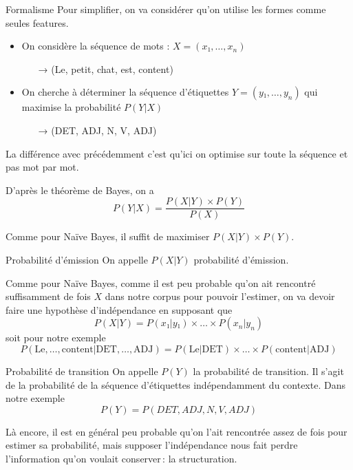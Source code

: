 \documentclass[../allslides.tex]{subfiles}
\begin{document}
\begin{frame}{Formalisme}
	Pour simplifier, on va considérer qu'on utilise les formes comme seules features.

	\begin{itemize}
		\item On considère la séquence de mots : $X=(x₁, …, x_n)$
			\begin{itemize}
				\item[→] (Le, petit, chat, est, content)
			\end{itemize}
		\item On cherche à déterminer la séquence d'étiquettes $Y=(y₁, …, y_n)$ qui maximise la probabilité $P(Y|X)$
			\begin{itemize}
				\item[→] (DET, ADJ, N, V, ADJ)
			\end{itemize}
	\end{itemize}

	La différence avec précédemment c'est qu'ici on optimise sur toute la séquence et pas mot par mot.

	\pause

	D'après le théorème de Bayes, on a
	\begin{equation}
		P(Y|X) = \frac{P(X|Y)×P(Y)}{P(X)}
	\end{equation}

	Comme pour Naïve Bayes, il suffit de maximiser $P(X|Y)×P(Y)$.
\end{frame}

\begin{frame}{Probabilité d'émission}
	On appelle $P(X|Y)$ \alert{probabilité d'émission}.

	Comme pour Naïve Bayes, comme il est peu probable qu'on ait rencontré suffisamment de fois $X$ dans notre corpus pour pouvoir l'estimer, on va devoir faire une hypothèse d'indépendance en supposant que
	\begin{equation}
		P(X|Y) = P(x₁|y₁) × … × P(x_n|y_n)
	\end{equation}
	soit pour notre exemple
	\begin{equation}
		P(\text{Le}, …, \text{content}|\text{DET}, …, \text{ADJ}) = P(\text{Le}|\text{DET}) × … × P(\text{content}|\text{ADJ})
	\end{equation}
\end{frame}

\begin{frame}{Probabilité de transition}
	On appelle $P(Y)$ la \alert{probabilité de transition}.
	Il s'agit de la probabilité de la séquence d'étiquettes indépendamment du contexte.
	Dans notre exemple
	\begin{equation}
		P(Y) = P(DET, ADJ, N, V, ADJ)
	\end{equation}

	Là encore, il est en général peu probable qu'on l'ait rencontrée assez de fois pour estimer sa probabilité, mais supposer l'indépendance nous fait perdre l'information qu'on voulait conserver : \alert{la structuration}.
\end{frame}
\end{document}
